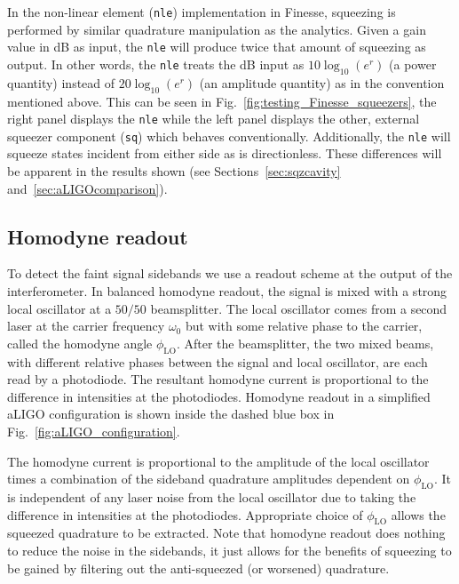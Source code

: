 \documentclass[aps,pra,superscriptaddress,reprint,nofootinbib]{revtex4-1}
\newcommand{\code}[1]{\texttt{#1}}
\begin{document}
In the non-linear element (\code{nle}) implementation in Finesse, squeezing is performed by similar quadrature manipulation as the analytics. Given a gain value in dB as input, the \code{nle} will produce twice that amount of squeezing as output. In other words, the \code{nle} treats the dB input as $10 \log_{10} (e^r)$ (a power quantity) instead of $20 \log_{10} (e^r)$ (an amplitude quantity) as in the convention mentioned above. This can be seen in Fig.~\ref{fig:testing_Finesse_squeezers}, the right panel displays the \code{nle} while the left panel displays the other, external squeezer component (\code{sq}) which behaves conventionally. Additionally, the \code{nle} will squeeze states incident from either side as is directionless. These differences will be apparent in the results shown (see Sections~\ref{sec:sqzcavity} and~\ref{sec:aLIGOcomparison}).


\subsection{Homodyne readout}
\label{sec:homodyne}

To detect the faint signal sidebands we use a readout scheme at the output of the interferometer. In balanced homodyne readout, the signal is mixed with a strong local oscillator at a $50/50$ beamsplitter. The local oscillator comes from a second laser at the carrier frequency $\omega_0$ but with some relative phase to the carrier, called the homodyne angle $\phi_{\mathrm{LO}}$. After the beamsplitter, the two mixed beams, with different relative phases between the signal and local oscillator, are each read by a photodiode.
The resultant homodyne current is proportional to the difference in intensities at the photodiodes.
Homodyne readout in a simplified aLIGO configuration is shown inside the dashed blue box in Fig.~\ref{fig:aLIGO_configuration}.


The homodyne current is proportional to the amplitude of the local oscillator times a combination of the sideband quadrature amplitudes dependent on $\phi_{\mathrm{LO}}$. It is independent of any laser noise from the local oscillator due to taking the difference in intensities at the photodiodes. Appropriate choice of $\phi_{\mathrm{LO}}$ allows the squeezed quadrature to be extracted. Note that homodyne readout does nothing to reduce the noise in the sidebands, it just allows for the benefits of squeezing to be gained by filtering out the anti-squeezed (or worsened) quadrature.
\end{document}
